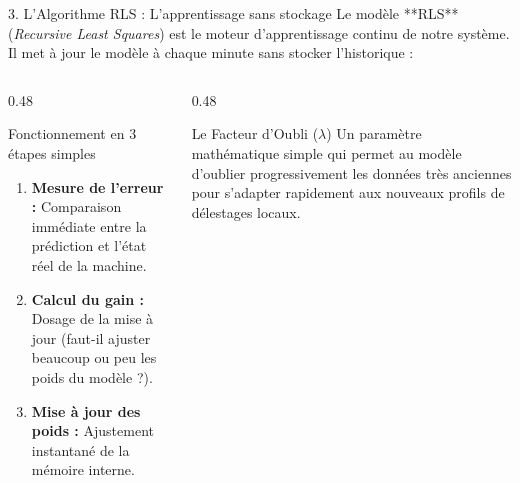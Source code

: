 \documentclass[10pt,aspectratio=169]{beamer}
\begin{document}
\begin{frame}{3. L'Algorithme RLS : L'apprentissage sans stockage}
  Le modèle **RLS** (\textit{Recursive Least Squares}) est le moteur d'apprentissage continu de notre système. Il met à jour le modèle à chaque minute sans stocker l'historique :
  
  \vspace{0.5em}
  \begin{columns}[T]
    \begin{column}{0.48\textwidth}
      \begin{block}{Fonctionnement en 3 étapes simples}
        \begin{enumerate}
          \item \textbf{Mesure de l'erreur :} Comparaison immédiate entre la prédiction et l'état réel de la machine.
          \item \textbf{Calcul du gain :} Dosage de la mise à jour (faut-il ajuster beaucoup ou peu les poids du modèle ?).
          \item \textbf{Mise à jour des poids :} Ajustement instantané de la mémoire interne.
        \end{enumerate}
      \end{block}
    \end{column}
    
    \begin{column}{0.48\textwidth}
      \begin{exampleblock}{Le Facteur d'Oubli ($\lambda$)}
        Un paramètre mathématique simple qui permet au modèle d'oublier progressivement les données très anciennes pour s'adapter rapidement aux nouveaux profils de délestages locaux.
      \end{exampleblock}
    \end{column}
  \end{columns}
\end{frame}
\end{document}
